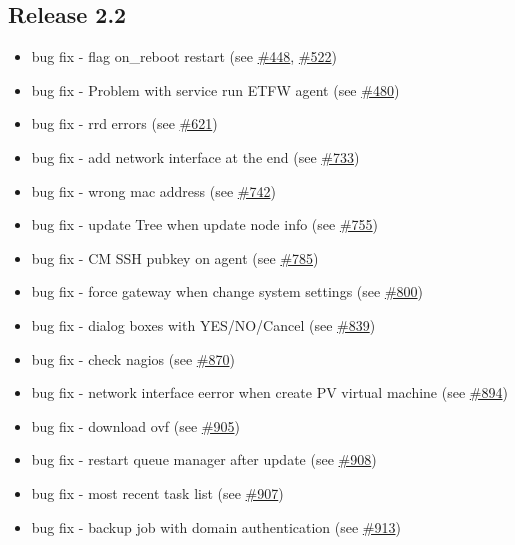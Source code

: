 \subsection{Release 2.2}

\begin{itemize}
    \item bug fix - flag on\_reboot restart (see \href{https://srcmaster.eurotux.com/pm/p/etva/ticket/448}{\#448}, \href{https://srcmaster.eurotux.com/pm/p/etva/ticket/522}{\#522})
    \item bug fix - Problem with service run ETFW agent (see \href{https://srcmaster.eurotux.com/pm/p/etva/ticket/480}{\#480})
    \item bug fix - rrd errors (see \href{https://srcmaster.eurotux.com/pm/p/etva/ticket/621}{\#621})
    \item bug fix - add network interface at the end (see \href{https://srcmaster.eurotux.com/pm/p/etva/ticket/733}{\#733})
    \item bug fix - wrong mac address (see \href{https://srcmaster.eurotux.com/pm/p/etva/ticket/742}{\#742})
    \item bug fix - update Tree when update node info (see \href{https://srcmaster.eurotux.com/pm/p/etva/ticket/755}{\#755})
    \item bug fix - CM SSH pubkey on agent (see \href{https://srcmaster.eurotux.com/pm/p/etva/ticket/785}{\#785})
    \item bug fix - force gateway when change system settings (see \href{https://srcmaster.eurotux.com/pm/p/etva/ticket/800}{\#800})
    \item bug fix - dialog boxes with YES/NO/Cancel (see \href{https://srcmaster.eurotux.com/pm/p/etva/ticket/839}{\#839})
    \item bug fix - check nagios (see \href{https://srcmaster.eurotux.com/pm/p/etva/ticket/870}{\#870})
    \item bug fix - network interface eerror when create PV virtual machine (see \href{https://srcmaster.eurotux.com/pm/p/etva/ticket/894}{\#894})
    \item bug fix - download ovf (see \href{https://srcmaster.eurotux.com/pm/p/etva/ticket/905}{\#905})
    \item bug fix - restart queue manager after update (see \href{https://srcmaster.eurotux.com/pm/p/etva/ticket/908}{\#908})
    \item bug fix - most recent task list (see \href{https://srcmaster.eurotux.com/pm/p/etva/ticket/907}{\#907})
    \item bug fix - backup job with domain authentication (see \href{https://srcmaster.eurotux.com/pm/p/etva/ticket/913}{\#913})

\end{itemize}
